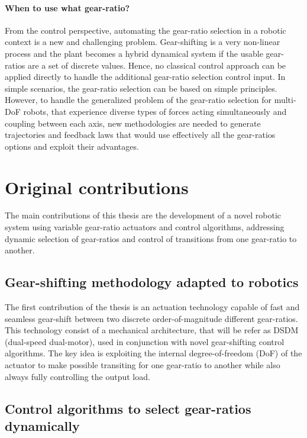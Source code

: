 \paragraph{When to use what gear-ratio?}
From the control perspective, automating the gear-ratio selection in a robotic context is a new and challenging problem. Gear-shifting is a very non-linear process and the plant becomes a hybrid dynamical system if the usable gear-ratios are a set of discrete values. Hence, no classical control approach can be applied directly to handle the additional gear-ratio selection control input. In simple scenarios, the gear-ratio selection can be based on simple principles. However, to handle the generalized problem of the gear-ratio selection for multi-DoF robots, that experience diverse types of forces acting simultaneously and coupling between each axis, new methodologies are needed to generate trajectories and feedback laws that would use effectively all the gear-ratios options and exploit their advantages.


\newpage

\section{Original contributions}
\label{sec:contribution}

The main contributions of this thesis are the development of a novel robotic system using variable gear-ratio actuators and control algorithms, addressing dynamic selection of gear-ratios and control of transitions from one gear-ratio to another.

\subsection{Gear-shifting methodology adapted to robotics}

The first contribution of the thesis is an actuation technology capable of fast and seamless gear-shift between two discrete order-of-magnitude different gear-ratios. This technology consist of a mechanical architecture, that will be refer as DSDM (dual-speed dual-motor), used in conjunction with novel gear-shifting control algorithms. The key idea is exploiting the internal degree-of-freedom (DoF) of the actuator to make possible transiting for one gear-ratio to another while also always fully controlling the output load. 

\subsection{Control algorithms to select gear-ratios dynamically}


